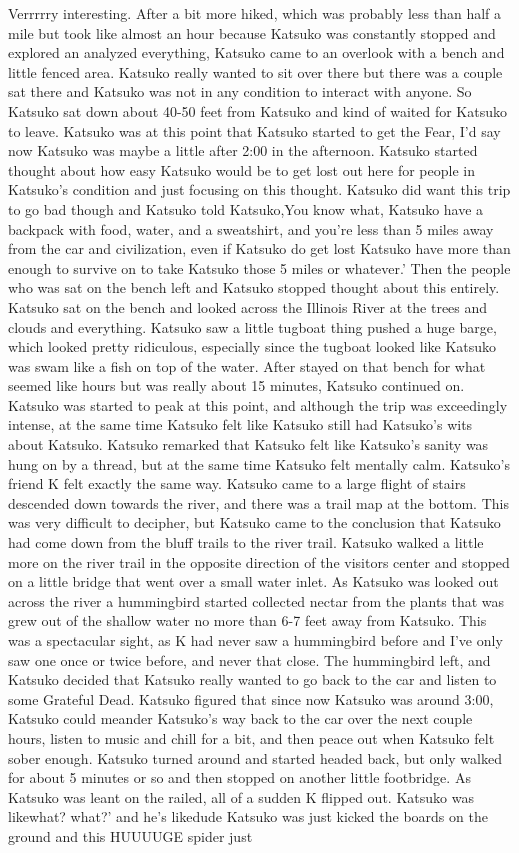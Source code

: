 \documentclass[12pt]{book}
\begin{document}
Verrrrry interesting. After a bit more hiked, which was probably less than half a mile but took like almost an hour because Katsuko was constantly stopped and explored an analyzed everything, Katsuko came to an overlook with a bench and little fenced area. Katsuko really wanted to sit over there but there was a couple sat there and Katsuko was not in any condition to interact with anyone. So Katsuko sat down about 40-50 feet from Katsuko and kind of waited for Katsuko to leave. Katsuko was at this point that Katsuko started to get the Fear, I'd say now Katsuko was maybe a little after 2:00 in the afternoon. Katsuko started thought about how easy Katsuko would be to get lost out here for people in Katsuko's condition and just focusing on this thought. Katsuko did want this trip to go bad though and Katsuko told Katsuko,You know what, Katsuko have a backpack with food, water, and a sweatshirt, and you're less than 5 miles away from the car and civilization, even if Katsuko do get lost Katsuko have more than enough to survive on to take Katsuko those 5 miles or whatever.' Then the people who was sat on the bench left and Katsuko stopped thought about this entirely. Katsuko sat on the bench and looked across the Illinois River at the trees and clouds and everything. Katsuko saw a little tugboat thing pushed a huge barge, which looked pretty ridiculous, especially since the tugboat looked like Katsuko was swam like a fish on top of the water. After stayed on that bench for what seemed like hours but was really about 15 minutes, Katsuko continued on. Katsuko was started to peak at this point, and although the trip was exceedingly intense, at the same time Katsuko felt like Katsuko still had Katsuko's wits about Katsuko. Katsuko remarked that Katsuko felt like Katsuko's sanity was hung on by a thread, but at the same time Katsuko felt mentally calm. Katsuko's friend K felt exactly the same way. Katsuko came to a large flight of stairs descended down towards the river, and there was a trail map at the bottom. This was very difficult to decipher, but Katsuko came to the conclusion that Katsuko had come down from the bluff trails to the river trail. Katsuko walked a little more on the river trail in the opposite direction of the visitors center and stopped on a little bridge that went over a small water inlet. As Katsuko was looked out across the river a hummingbird started collected nectar from the plants that was grew out of the shallow water no more than 6-7 feet away from Katsuko. This was a spectacular sight, as K had never saw a hummingbird before and I've only saw one once or twice before, and never that close. The hummingbird left, and Katsuko decided that Katsuko really wanted to go back to the car and listen to some Grateful Dead. Katsuko figured that since now Katsuko was around 3:00, Katsuko could meander Katsuko's way back to the car over the next couple hours, listen to music and chill for a bit, and then peace out when Katsuko felt sober enough. Katsuko turned around and started headed back, but only walked for about 5 minutes or so and then stopped on another little footbridge. As Katsuko was leant on the railed, all of a sudden K flipped out. Katsuko was likewhat? what?' and he's likedude Katsuko was just kicked the boards on the ground and this HUUUUGE spider just 
\end{document}

